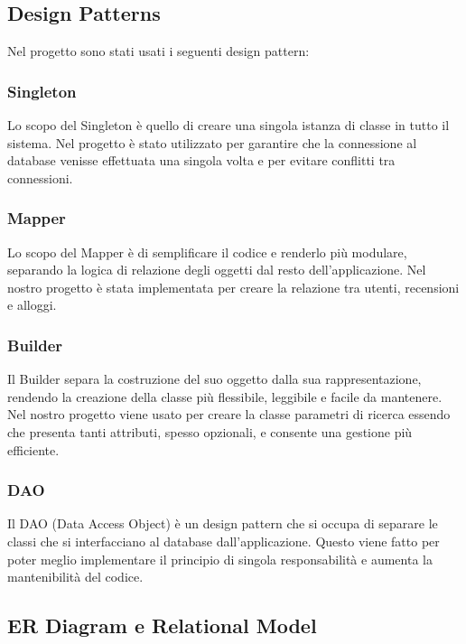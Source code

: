 \documentclass[10pt]{article}
\begin{document}
\subsection{Design Patterns}
Nel progetto sono stati usati i seguenti design pattern:
\subsubsection{Singleton}

Lo scopo del Singleton è quello di creare una singola istanza di classe in tutto il sistema. Nel progetto è stato utilizzato per garantire che la connessione al database venisse effettuata una singola volta e per evitare conflitti tra connessioni.

\subsubsection{Mapper}

Lo scopo del Mapper è di semplificare il codice e renderlo più modulare, separando la logica di relazione degli oggetti dal resto dell'applicazione. Nel nostro progetto è stata implementata per creare la relazione tra utenti, recensioni e alloggi.

\subsubsection{Builder}

Il Builder separa la costruzione del suo oggetto dalla sua rappresentazione, rendendo la creazione della classe più flessibile, leggibile e facile da mantenere. Nel nostro progetto viene usato per creare la classe parametri di ricerca essendo che presenta tanti attributi, spesso opzionali, e consente una gestione più efficiente.

\subsubsection{DAO}

Il DAO (Data Access Object) è un design pattern che si occupa di separare le classi che si interfacciano al database dall'applicazione. Questo viene fatto
per poter meglio implementare il principio di singola responsabilità e aumenta
la mantenibilità del codice.

\subsection{ER Diagram e Relational Model}
\end{document}
